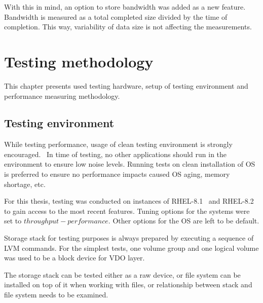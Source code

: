 \documentclass[
  color, %
  table, %
  lof,   %
  lot,   %
]{fithesis3}
\begin{document}
With this in mind, an option to store bandwidth was added as a new feature. Bandwidth is measured as a total completed size divided by the time of completion. This way, variability of data size is not affecting the measurements.




\chapter{Testing methodology}
\label{methodology}
This chapter presents used testing hardware, setup of testing environment and performance measuring methodology.


\section{Testing environment}
While testing performance, usage of clean testing environment is strongly encouraged.~\cite{Traeger:2008:NYS:1367829.1367831} In time of testing, no other applications should run in the environment to ensure low noise levels. Running tests on clean installation of OS is preferred to ensure no performance impacts caused OS aging, memory shortage, etc.

For this thesis, testing was conducted on instances of RHEL-8.1~\cite{notes:rhel81} and RHEL-8.2~\cite{notes:rhel82} to gain access to the most recent features. Tuning options for the systems were set to $throughput-performance$. Other options for the OS are left to be default.

Storage stack for testing purposes is always prepared by executing a sequence of LVM commands. For the simplest tests, one volume group and one logical volume was used to be a block device for VDO layer.

The storage stack can be tested either as a raw device, or file system can be installed on top of it when working with files, or relationship between stack and file system needs to be examined.
\end{document}
